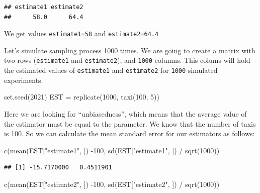 \documentclass[
]{book}
\newenvironment{Shaded}{\begin{snugshade}}{\end{snugshade}}
\newcommand{\DecValTok}[1]{\textcolor[rgb]{0.00,0.00,0.81}{#1}}
\newcommand{\FunctionTok}[1]{\textcolor[rgb]{0.00,0.00,0.00}{#1}}
\newcommand{\NormalTok}[1]{#1}
\newcommand{\OtherTok}[1]{\textcolor[rgb]{0.56,0.35,0.01}{#1}}
\newcommand{\SpecialCharTok}[1]{\textcolor[rgb]{0.00,0.00,0.00}{#1}}
\newcommand{\StringTok}[1]{\textcolor[rgb]{0.31,0.60,0.02}{#1}}
\theoremstyle{definition}
\theoremstyle{definition}
\theoremstyle{definition}
\theoremstyle{definition}
\theoremstyle{remark}
\begin{document}
\begin{verbatim}
## estimate1 estimate2 
##      58.0      64.4
\end{verbatim}

We get values \texttt{estimate1=58} and \texttt{estimate2=64.4}

Let's simulate sampling process 1000 times. We are going to create a matrix with two rows (\texttt{estimate1} and \texttt{estimate2}), and \texttt{1000} columns. This colums will hold the estimated values of \texttt{estimate1} and \texttt{estimate2} for \texttt{1000} simulated experiments.

\begin{Shaded}
\begin{Highlighting}[]
\FunctionTok{set.seed}\NormalTok{(}\DecValTok{2021}\NormalTok{)}
\NormalTok{EST }\OtherTok{=} \FunctionTok{replicate}\NormalTok{(}\DecValTok{1000}\NormalTok{, }\FunctionTok{taxi}\NormalTok{(}\DecValTok{100}\NormalTok{, }\DecValTok{5}\NormalTok{))}
\end{Highlighting}
\end{Shaded}

Here we are looking for ``unbiasedness'', which means that the average value of the estimator must be equal to the parameter. We know that the number of taxis is 100. So we can calculate the mean standard error for our estimators as follows:

\begin{Shaded}
\begin{Highlighting}[]
\FunctionTok{c}\NormalTok{(}\FunctionTok{mean}\NormalTok{(EST[}\StringTok{"estimate1"}\NormalTok{, ]) }\SpecialCharTok{{-}}\DecValTok{100}\NormalTok{, }\FunctionTok{sd}\NormalTok{(EST[}\StringTok{"estimate1"}\NormalTok{, ]) }\SpecialCharTok{/} \FunctionTok{sqrt}\NormalTok{(}\DecValTok{1000}\NormalTok{))}
\end{Highlighting}
\end{Shaded}

\begin{verbatim}
## [1] -15.7170000   0.4511901
\end{verbatim}

\begin{Shaded}
\begin{Highlighting}[]
\FunctionTok{c}\NormalTok{(}\FunctionTok{mean}\NormalTok{(EST[}\StringTok{"estimate2"}\NormalTok{, ]) }\SpecialCharTok{{-}}\DecValTok{100}\NormalTok{, }\FunctionTok{sd}\NormalTok{(EST[}\StringTok{"estimate2"}\NormalTok{, ]) }\SpecialCharTok{/} \FunctionTok{sqrt}\NormalTok{(}\DecValTok{1000}\NormalTok{))}
\end{Highlighting}
\end{Shaded}
\end{document}
